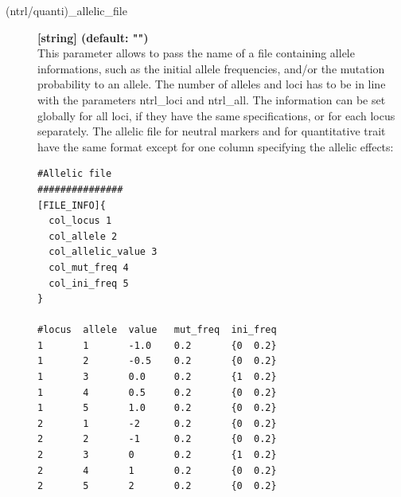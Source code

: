\documentclass[letterpaper,12pt,oneside]{book}
\begin{document}
\begin{description}
\item[\label{allelicFile}(ntrl/quanti)\_allelic\_file]  \textbf{[string] (default: "")} \\
This parameter allows to pass the name of a file containing allele informations, such as the initial allele frequencies, and/or the mutation probability to an allele. The number of alleles and loci has to be in line with the parameters \textsf{ntrl\_loci} and \textsf{ntrl\_all}. The information can be set globally for all loci, if they have the same specifications, or for each locus separately. The allelic file for neutral markers and for quantitative trait have the same format except for one column specifying the allelic effects:

\begin{lstlisting}[frame=single]
#Allelic file 
###############
[FILE_INFO]{
  col_locus 1
  col_allele 2
  col_allelic_value 3
  col_mut_freq 4
  col_ini_freq 5
}

#locus  allele  value   mut_freq  ini_freq  
1       1       -1.0    0.2       {0  0.2}
1       2       -0.5    0.2       {0  0.2}
1       3       0.0     0.2       {1  0.2}
1       4       0.5     0.2       {0  0.2}
1       5       1.0     0.2       {0  0.2}
2       1       -2      0.2       {0  0.2}
2       2       -1      0.2       {0  0.2}
2       3       0       0.2       {1  0.2}
2       4       1       0.2       {0  0.2}
2       5       2       0.2       {0  0.2}
\end{lstlisting}


\end{description}
\end{document}

